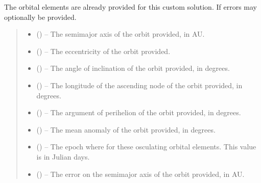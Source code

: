 \documentclass[letterpaper,11pt,english]{sphinxmanual}
\begin{document}
\begin{savenotes}
\begin{fulllineitems}
\begin{savenotes}
\begin{fulllineitems}
\pysigstopsignatures
\sphinxAtStartPar
The orbital elements are already provided for this custom
solution. If errors may optionally be provided.
\begin{quote}\begin{description}
\begin{itemize}
\item {} 
\sphinxAtStartPar
{} () – The semi\sphinxhyphen{}major axis of the orbit provided, in AU.

\item {} 
\sphinxAtStartPar
{} () – The eccentricity of the orbit provided.

\item {} 
\sphinxAtStartPar
{} () – The angle of inclination of the orbit provided, in degrees.

\item {} 
\sphinxAtStartPar
{} () – The longitude of the ascending node of the orbit
provided, in degrees.

\item {} 
\sphinxAtStartPar
{} () – The argument of perihelion of the orbit provided, in degrees.

\item {} 
\sphinxAtStartPar
{} () – The mean anomaly of the orbit provided, in degrees.

\item {} 
\sphinxAtStartPar
{} () – The epoch where for these osculating orbital elements. This value is
in Julian days.

\item {} 
\sphinxAtStartPar
{} (\sphinxstyleliteralemphasis{\sphinxupquote{, }}) – The error on the semi\sphinxhyphen{}major axis of the orbit provided, in AU.


\end{itemize}
\end{description}
\end{quote}
\end{fulllineitems}
\end{savenotes}
\end{fulllineitems}
\end{savenotes}
\end{document}
